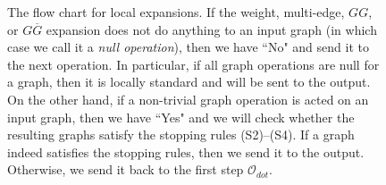 \documentclass{article}
\newcommand{\1}{\mathds{1}}
\numberwithin{equation}{section}
\renewcommand{\cal}{\mathcal}
\theoremstyle{plain} %
\theoremstyle{remark}
\begin{document}
\begin{figure}
\begin{center}
\end{center}
\caption{The flow chart for local expansions. If the weight, multi-edge, $GG$, or $G\overline G$ expansion does not do anything to an input graph (in which case we call it a \emph{null operation}), then we have ``No" and send it to the next operation. In particular, if all  graph operations are null for a graph, then it is locally standard and will be sent to the output.
On the other hand, if a non-trivial graph operation is acted on an input graph, then we have ``Yes"  and we will check whether the resulting graphs satisfy the stopping rules (S2)--(S4). If a graph indeed satisfies the stopping rules, then we send it to the output. Otherwise, we send it back to the first step $\cal O_{dot}$.}\label{Fig chart1}
\end{figure}
\end{document}
